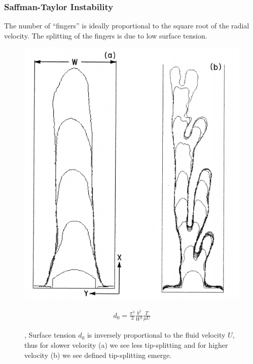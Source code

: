 \documentclass{beamer}
\begin{document}
\begin{frame}
\frametitle{Saffman-Taylor Instability}
The number of ``fingers'' is ideally proportional to the square root of the radial velocity. 
The splitting of the fingers is due to low surface tension. 
\begin{figure}
   \noindent\begin{minipage}{.45\textwidth}
   \centering
   \includegraphics[scale=0.33]{Saffman_Taylor_surface_tension.PNG}
   \label{fig:dendrite}
\end{minipage}
\begin{minipage}{.45\textwidth}
\begin{align*}
   \boxed{d_0 = \frac{\pi^3}{3}\frac{b^2}{W^2}\frac{T}{\mu U}}
\end{align*}
\end{minipage}
\caption{\cite{Liang86}, \cite{Bensimon} Surface tension $d_0$ is inversely proportional to the fluid velocity $U$, thus for slower velocity (a) we see less tip-splitting and for higher velocity (b) we see defined tip-splitting emerge.}
    \hspace{10pt}
    \label{fig:ST_instability}
\end{figure}
\end{frame}
\end{document}
